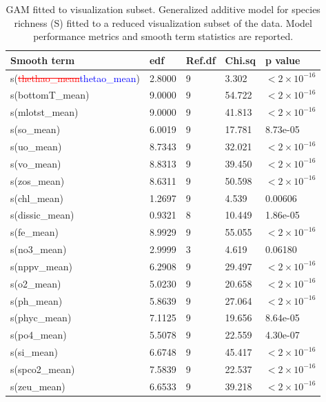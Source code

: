 \documentclass[a4paper,fleqn]{cas-sc}
\DeclareRobustCommand{\deleted}[1]{\textcolor{red}{\sout{#1}}}
\DeclareRobustCommand{\added}[1]{\textcolor{blue}{#1}}
\begin{document}
\begin{table}[width=.9\linewidth,cols=5,pos=!htbp]
\caption{GAM fitted to visualization subset. Generalized additive model for species richness (S) fitted to a reduced visualization subset of the data. Model performance metrics and smooth term statistics are reported.}
\small
\begin{tabular*}{\tblwidth}{@{} LLLLL @{}}
\toprule
\textbf{Smooth term} & \textbf{edf} & \textbf{Ref.df} & \textbf{Chi.sq} & \textbf{p value} \\
\midrule
s(\deleted{thethao\_mean}\added{thetao\_mean})      & 2.8000 & 9 &  3.302 & $<2 \times 10^{-16}$ \\
s(bottomT\_mean) & 9.0000 & 9 & 54.722 & $<2 \times 10^{-16}$ \\
s(mlotst\_mean)   & 9.0000 & 9 & 41.813 & $<2 \times 10^{-16}$ \\
s(so\_mean)       & 6.0019 & 9 & 17.781 & 8.73e-05 \\
s(uo\_mean)       & 8.7343 & 9 & 32.021 & $<2 \times 10^{-16}$ \\
s(vo\_mean)       & 8.8313 & 9 & 39.450 & $<2 \times 10^{-16}$ \\
s(zos\_mean)      & 8.6311 & 9 & 50.598 & $<2 \times 10^{-16}$ \\
s(chl\_mean)      & 1.2697 & 9 &  4.539 & 0.00606  \\
s(dissic\_mean)   & 0.9321 & 8 & 10.449 & 1.86e-05 \\
s(fe\_mean)       & 8.9929 & 9 & 55.055 & $<2 \times 10^{-16}$ \\
s(no3\_mean)      & 2.9999 & 3 &  4.619 & 0.06180  \\
s(nppv\_mean)     & 6.2908 & 9 & 29.497 & $<2 \times 10^{-16}$ \\
s(o2\_mean)       & 5.0230 & 9 & 20.658 & $<2 \times 10^{-16}$ \\
s(ph\_mean)       & 5.8639 & 9 & 27.064 & $<2 \times 10^{-16}$ \\
s(phyc\_mean)     & 7.1125 & 9 & 19.656 & 8.64e-05 \\
s(po4\_mean)      & 5.5078 & 9 & 22.559 & 4.30e-07 \\
s(si\_mean)       & 6.6748 & 9 & 45.417 & $<2 \times 10^{-16}$ \\
s(spco2\_mean)    & 7.5839 & 9 & 22.537 & $<2 \times 10^{-16}$ \\
s(zeu\_mean)      & 6.6533 & 9 & 39.218 & $<2 \times 10^{-16}$ \\
\bottomrule
\end{tabular*}
\label{tab:17}
\end{table}
\FloatBarrier
\end{document}
